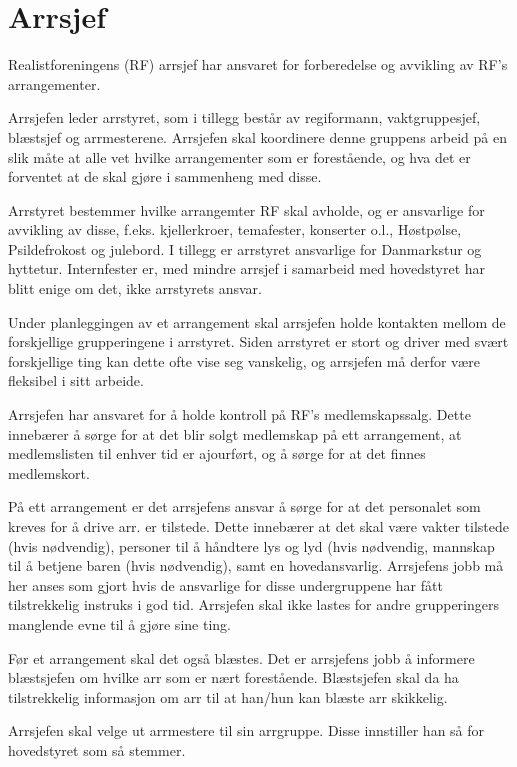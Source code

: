 \section{Arrsjef}

Realistforeningens (RF) arrsjef har ansvaret for forberedelse og avvikling
av RF's arrangementer.

Arrsjefen leder arrstyret, som i tillegg består av
regiformann, vaktgruppesjef, blæstsjef og arrmesterene. Arrsjefen
skal koordinere denne gruppens arbeid på en slik måte at alle vet hvilke
arrangementer som er forestående, og hva det er forventet at de skal gjøre
i sammenheng med disse.

Arrstyret bestemmer hvilke arrangemter RF skal avholde, og er ansvarlige
for avvikling av disse, f.eks.
kjellerkroer, temafester, konserter o.l., Høstpølse, Psildefrokost og
julebord. I tillegg er arrstyret ansvarlige for Danmarkstur og hyttetur.
Internfester er, med mindre arrsjef i samarbeid med hovedstyret har blitt
enige om det, ikke arrstyrets ansvar.

Under planleggingen av et arrangement skal arrsjefen holde kontakten
mellom de forskjellige grupperingene i arrstyret. Siden arrstyret er
stort og driver med svært forskjellige ting kan dette ofte vise seg
vanskelig, og arrsjefen må derfor være fleksibel i sitt arbeide.

Arrsjefen har ansvaret for å holde kontroll på RF's medlemskapssalg. Dette
innebærer å sørge for at det blir solgt medlemskap på ett arrangement, at
medlemslisten til enhver tid er ajourført, og å sørge for at det finnes
medlemskort.

På ett arrangement er det arrsjefens ansvar å sørge for at det personalet
som kreves for å drive arr. er tilstede. Dette innebærer at det skal være
vakter tilstede (hvis nødvendig), personer til å håndtere lys og lyd (hvis
nødvendig, mannskap til å betjene baren (hvis nødvendig), samt en
hovedansvarlig. Arrsjefens jobb må her anses som gjort hvis de ansvarlige
for disse undergruppene har fått tilstrekkelig instruks i god tid.
Arrsjefen skal ikke lastes for andre grupperingers manglende evne til å
gjøre sine ting.

Før et arrangement skal det også blæstes. Det er arrsjefens jobb å
informere blæstsjefen om hvilke arr som er nært forestående. Blæstsjefen
skal da ha tilstrekkelig informasjon om arr til at han/hun kan blæste arr
skikkelig.

Arrsjefen skal velge ut arrmestere til sin arrgruppe. Disse innstiller han
så for hovedstyret som så stemmer.


